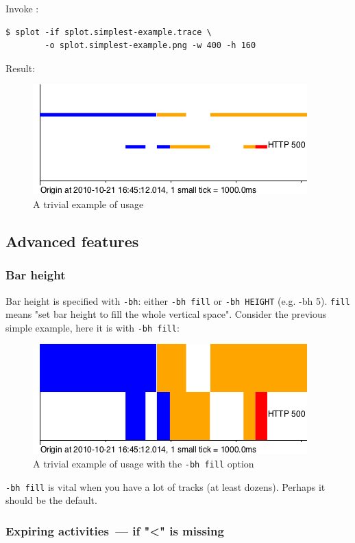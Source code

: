 \documentclass{article}
\begin{document}
Invoke \splot{}:
\begin{verbatim}
$ splot -if splot.simplest-example.trace \
        -o splot.simplest-example.png -w 400 -h 160
\end{verbatim}

Result:
\begin{figure}[h]
\center
\includegraphics[scale=0.5]{pics/splot/splot-simplest-example.png}
\caption{A trivial example of \splot{} usage}
\end{figure}

\subsection{Advanced features}

\subsubsection{Bar height}
Bar height is specified with \verb|-bh|: either \verb|-bh fill| or \verb|-bh HEIGHT| (e.g. -bh 5). \verb|fill| means "set bar height to fill the whole vertical space". Consider the previous simple example, here it is with \verb|-bh fill|:

\begin{figure}[h]
\center
\includegraphics[scale=0.5]{pics/splot/splot-simplest-example-fill.png}
\caption{A trivial example of \splot{} usage with the \texttt{-bh fill} option}
\end{figure}

\verb|-bh fill| is vital when you have a lot of tracks (at least dozens). Perhaps it should be the default.

\subsubsection{Expiring activities~--- if "<" is missing}
\end{document}
